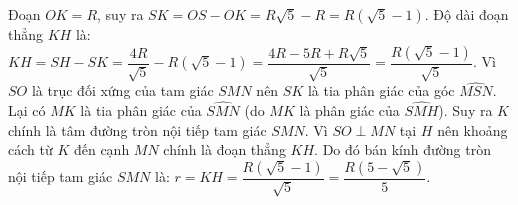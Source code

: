 \begin{bt}
{\begin{enumerate}[a)]
    Đoạn $OK = R$, suy ra $SK = OS - OK = R\sqrt{5} - R = R(\sqrt{5} - 1)$.
    Độ dài đoạn thẳng $KH$ là:
    $KH = SH - SK = \dfrac{4R}{\sqrt{5}} - R(\sqrt{5} - 1) = \dfrac{4R - 5R + R\sqrt{5}}{\sqrt{5}} = \dfrac{R(\sqrt{5} - 1)}{\sqrt{5}}$.
    Vì $SO$ là trục đối xứng của tam giác $SMN$ nên $SK$ là tia phân giác của góc $\widehat{MSN}$.
    Lại có $MK$ là tia phân giác của $\widehat{SMN}$ (do $MK$ là phân giác của $\widehat{SMH}$).
    Suy ra $K$ chính là tâm đường tròn nội tiếp tam giác $SMN$.
    Vì $SO \perp MN$ tại $H$ nên khoảng cách từ $K$ đến cạnh $MN$ chính là đoạn thẳng $KH$.
    Do đó bán kính đường tròn nội tiếp tam giác $SMN$ là:
    $r = KH = \dfrac{R(\sqrt{5} - 1)}{\sqrt{5}} = \dfrac{R(5 - \sqrt{5})}{5}$.
\end{enumerate}
}
\end{bt}
